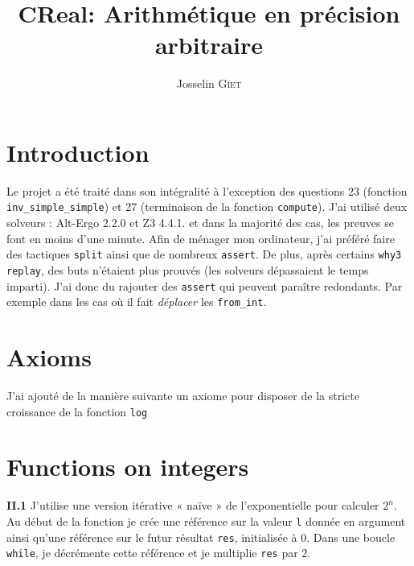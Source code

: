 \documentclass[9pt,a4paper,twocolumn]{article}
\title{CReal: Arithmétique en précision arbitraire}   %
\author{Josselin \textsc{Giet}}  %
\theoremstyle{definition}
\newenvironment{code}[1][ocaml]{%
\newgeometry{textwidth = 0.8\textwidth}
\VerbatimEnvironment\begin{verbatim}%
}{%
\end{verbatim}
\restoregeometry
}
\begin{document}
\maketitle

\section*{Introduction}

Le projet a été traité dans son intégralité à l'exception des questions 23
(fonction \texttt{inv\_simple\_simple}) et 27 (terminaison de la fonction
\texttt{compute}).
J'ai utilisé deux solveurs : Alt-Ergo 2.2.0 et Z3 4.4.1. et dans la majorité des
cas, les preuves se font en moins d'une minute.
Afin de ménager mon ordinateur, j'ai préféré faire des tactiques \texttt{split}
ainsi que de nombreux \texttt{assert}.
De plus, après certains \texttt{why3 replay}, des buts n'étaient plus prouvés
(les solveurs dépassaient le temps imparti).
J'ai donc du rajouter des \texttt{assert} qui peuvent paraître redondants.
Par exemple dans les cas où il fait \textit{déplacer} les \texttt{from\_int}.





\tableofcontents

\section{Axioms}


J'ai ajouté de la manière suivante un axiome pour disposer de la stricte
croissance de la fonction \texttt{log}

\section{Functions on integers}

\textbf{II.1}
J'utilise une version itérative « naïve » de l'exponentielle pour
calculer $2^n$. Au début de la fonction je crée une référence sur la valeur
\texttt{l} donnée en argument ainsi qu'une référence sur le futur résultat
\texttt{res}, initialisée à 0. Dans une boucle \texttt{while}, je décrémente
cette référence et je multiplie \texttt{res} par $2$.
\end{document}
